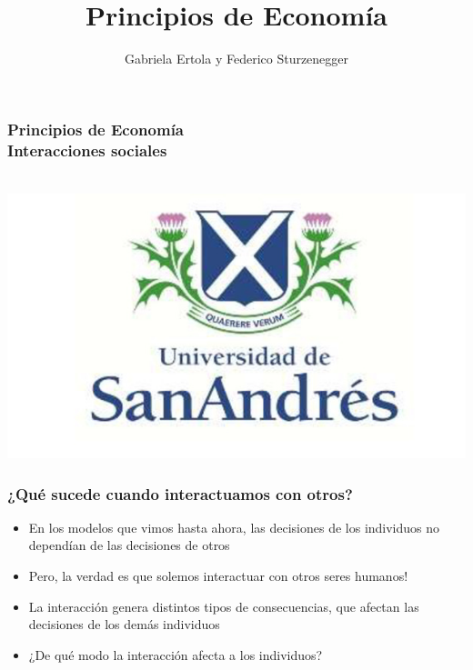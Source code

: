 \documentclass{beamer}
\title[Principios de Economía]{Principios de Economía}
\date{}
\author[Ertola y Sturzenegger]{Gabriela Ertola y Federico Sturzenegger }
\institute[]{Universidad de San Andrés \\
2022}
\begin{document}
\begin{frame}
\frametitle{Principios de Economía
\centering
\\ \vspace{12mm} Interacciones sociales}
\centering
 \\ \vspace{12mm} %
\includegraphics[scale=0.25]{Figures/logoUDESA.jpg} 
\end{frame}


\begin{frame}
\frametitle{¿Qué sucede cuando interactuamos con otros?}
\begin{itemize}
    \item En los modelos que vimos hasta ahora, las decisiones de los individuos no dependían de las decisiones de otros
    \item Pero, la verdad es que solemos interactuar con otros seres humanos!
    \item La interacción genera distintos tipos de consecuencias, que afectan las decisiones de los demás individuos
    \item ¿De qué modo la interacción afecta a los individuos? 
\end{itemize} 
\end{frame}
\end{document}
